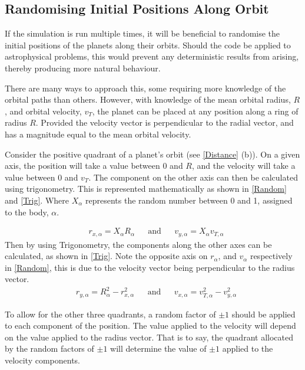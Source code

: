 \documentclass[a4paper,10pt]{article}
\begin{document}
\subsection{Randomising Initial Positions Along Orbit}

If the simulation is run multiple times, it will be beneficial to randomise the initial positions of the planets along their orbits. Should the code be applied to astrophysical problems, this would prevent any deterministic results from arising, thereby producing more natural behaviour. 

There are many ways to approach this, some requiring more knowledge of the orbital paths than others. However, with knowledge of the mean orbital radius, $R$, and orbital velocity, $v_T$, the planet can be placed at any position along a ring of radius $R$. Provided the velocity vector is perpendicular to the radial vector, and has a magnitude equal to the mean orbital velocity. 

Consider the positive quadrant of a planet's orbit (see \cref{Distance} (b)). On a given axis, the position will take a value between 0 and $R$, and the velocity will take a value between 0 and $v_T$. The component on the other axis can then be calculated using trigonometry. This is represented mathematically as shown in \cref{Random} and \cref{Trig}. Where $X_{\alpha}$ represents the random number between 0 and 1, assigned to the body, $\alpha$.

\begin{align}\label{Random}
&r_{x,\alpha} = X_{\alpha} R_{\alpha}&
&\text{and}&
&v_{y,\alpha} = X_{\alpha} v_{T,\alpha}
\end{align}
Then by using Trigonometry, the components along the other axes can be calculated, as shown in \cref{Trig}. Note the opposite axis on $r_{\alpha}$, and $v_{\alpha}$ respectively in \cref{Random}, this is due to the velocity vector being perpendicular to the radius vector.
\begin{align}\label{Trig}
&r_{y,\alpha} = R_{\alpha}^2 - r_{x,\alpha}^2&
&\text{and}&
&v_{x,\alpha} = v_{T,\alpha}^2 - v_{y,\alpha}^2
\end{align}

To allow for the other three quadrants, a random factor of $\pm 1$ should be applied to each component of the position. The value applied to the velocity will depend on the value applied to the radius vector. That is to say, the quadrant allocated by the random factors of $\pm1$ will determine the value of $\pm1$ applied to the velocity components. 
\end{document}
